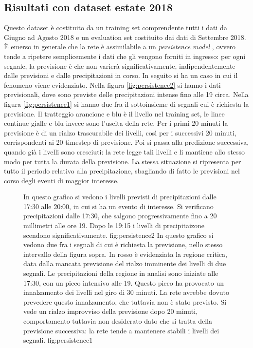\subsection{Risultati con dataset estate 2018}
Questo dataset è costituito da un training set comprendente tutti i dati da Giugno ad Agosto 2018 e un evaluation set costituito dai dati di Settembre 2018. È emerso in generale che la rete è assimilabile a un \textit{persistence model} \cite{flovik_flovik_2018}, ovvero tende a ripetere semplicemente i dati che gli vengono forniti in ingresso: per ogni segnale, la previsione è che non varierà significativamente, indipendentemente dalle previsioni e dalle precipitazioni in corso. In seguito si ha un caso in cui il fenomeno viene evidenziato. Nella figura \ref{fig:persistence2} si hanno i dati previsionali, dove sono previste delle precipitazioni intense fino alle 19 circa. Nella figura \ref{fig:persistence1} si hanno due fra il sottoinsieme di segnali cui è richiesta la previsione. Il tratteggio arancione e blu è il livello nel training set, le linee continue gialle e blu invece sono l’uscita della rete. Per i primi 20 minuti la previsione è di un rialzo trascurabile dei livelli, così per i successivi 20 minuti, corrispondenti ai 20 timestep di previsione. Poi si passa alla predizione successiva, quando già i livelli sono cresciuti: la rete legge tali livelli e li mantiene allo stesso modo per tutta la durata della previsione. La stessa situazione si ripresenta per tutto il periodo relativo alla precipitazione, sbagliando di fatto le previsioni nel corso degli eventi di maggior interesse.
\begin{figure}[H]
\centering
{In questo grafico si vedono i livelli previsti di precipitazioni dalle 17:30 alle 20:00, in cui si ha un evento di interesse. Si verificano precipitazioni dalle 17:30, che salgono progressivamente fino a 20 millimetri alle ore 19. Dopo le 19:15 i livelli di precipitaizone scendono significativamente. }
{fig:persistence2}
{In questo grafico si vedono due fra i segnali di cui è richiesta la previsione, nello stesso intervallo della figura sopra. In rosso è evidenziata la regione critica, data dalla mancata previsione del rialzo imminente dei livelli di due segnali. Le precipitazioni della regione in analisi sono iniziate alle 17:30, con un picco intensivo alle 19. Questo picco ha provocato un innalzamento dei livelli nel giro di 30 minuti. La rete avrebbe dovuto prevedere questo innalzamento, che tuttavia non è stato previsto. Si vede un rialzo improvviso della previsione dopo 20 minuti, comportamento tuttavia non desiderato dato che si tratta della previsione successiva: la rete tende a mantenere stabili i livelli dei segnali. }
{fig:persistence1}
\end{figure}

